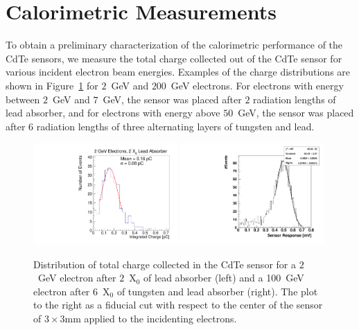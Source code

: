 
\section{Calorimetric Measurements} 
\label{sec:calorimetery} 

To obtain a preliminary characterization of the calorimetric performance 
of the CdTe sensors, we measure the total charge collected out of the CdTe 
sensor for various incident electron beam energies. Examples of the 
charge distributions are shown in Figure~\ref{fig:ChargeDistribution}
for $2$~GeV and $200$~GeV electrons. For electrons with energy between 
$2$~GeV and $7$~GeV, the sensor was placed after $2$ radiation lengths 
of lead absorber, and for electrons with energy above $50$~GeV, the 
sensor was placed after $6$ radiation lengths of three alternating layers of 
tungsten and lead. 

\begin{figure}[htbp] 
\centering
\includegraphics[width=0.49\textwidth]{figures/2GeV_charge.pdf} 
\includegraphics[width=0.49\textwidth]{figures/CdTeEnergy.pdf} 
\caption{Distribution of total charge collected in the CdTe sensor for a $2$~GeV
electron after $2$~$\mathrm{X}_{0}$ of lead absorber (left) and a 100~GeV
electron after $6$~$\mathrm{X}_{0}$ of tungsten and lead absorber (right). The plot
to the right as a fiducial cut with respect to the center of the sensor of $\mathrm{3 \times 3 mm}$ applied to the incidenting electrons.} 
\label{fig:ChargeDistribution} 
\end{figure} 

